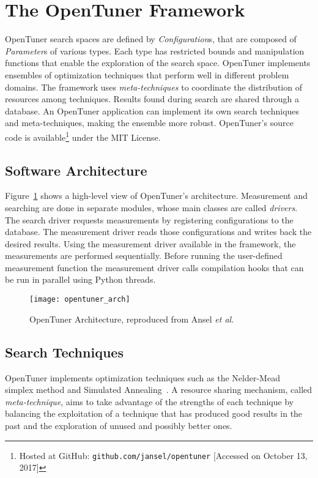 \section{The OpenTuner Framework}
\label{sec:opentuner}

OpenTuner search spaces are defined by \emph{Configuration}s, that are composed
of \emph{Parameter}s of various types. Each type has restricted bounds and
manipulation functions that enable the exploration of the search space.
OpenTuner implements ensembles of optimization techniques that perform well in
different problem domains. The framework uses \emph{meta-techniques} to
coordinate the distribution of resources among techniques.  Results found
during search are shared through a database. An OpenTuner application can
implement its own search techniques and meta-techniques, making the ensemble
more robust.  OpenTuner's source code is available\footnote{Hosted at GitHub:
\texttt{\scriptsize github.com/jansel/opentuner} [Accessed on October 13,
2017]} under the MIT License.

\subsection{Software Architecture}
\label{sec:arch}

Figure~\ref{fig:ot-imp} shows a high-level view of OpenTuner's architecture.
Measurement and searching are done in separate modules, whose main classes are
called \emph{drivers}. The search driver requests measurements by registering
configurations to the database. The measurement driver reads those
configurations and writes back the desired results. Using the measurement
driver available in the framework, the measurements are performed sequentially.
Before running the user-defined measurement function the measurement
driver calls compilation hooks that can be run in parallel using Python
threads.

\begin{figure}[htpb]
    \centering
    \texttt{[image: opentuner\_arch]}
    \caption{OpenTuner Architecture, reproduced from Ansel \emph{et
    al.}~\cite{ansel2014opentuner}}
    \label{fig:ot-imp}
\end{figure}

\subsection{Search Techniques}
\label{sec:techniques}

OpenTuner implements optimization techniques such as the
Nelder-Mead~\cite{nelder1965simplex} simplex method and Simulated
Annealing~\cite{kirkpatrick1983optimization}. A resource sharing mechanism,
called \emph{meta-technique}, aims to take advantage of the strengths of each
technique by balancing the exploitation of a technique that has produced good
results in the past and the exploration of unused and possibly better ones.

